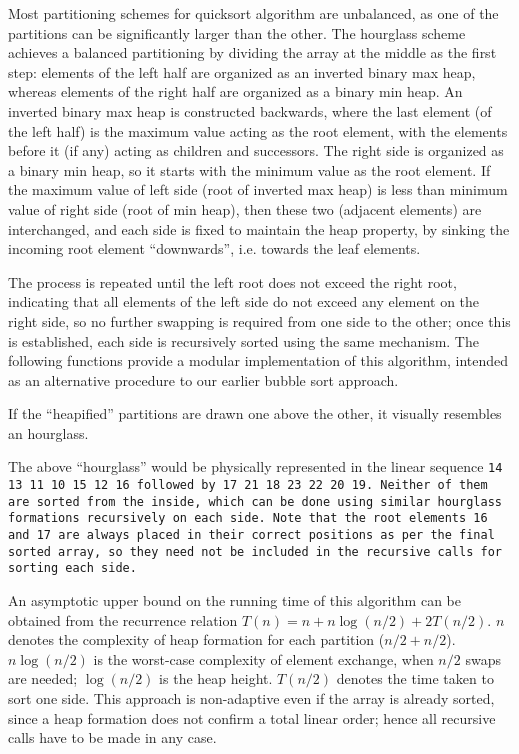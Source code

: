 Most partitioning schemes for quicksort algorithm are unbalanced,
as one of the partitions can be significantly larger than the other.
The hourglass scheme achieves a balanced partitioning by dividing
the array at the middle as the first step: elements of the left
half are organized as an inverted binary max heap, whereas
elements of the right half are organized as a binary min heap.
An inverted binary max heap is constructed backwards, where the last
element (of the left half) is the maximum value acting as the root element,
with the elements before it (if any) acting as children and successors.
The right side is organized as a binary min heap,
so it starts with the minimum value as the root element.
If the maximum value of left side (root of inverted max heap) is less than
minimum value of right side (root of min heap), then these two (adjacent elements)
are interchanged, and each side is fixed to maintain the heap property, by
sinking the incoming root element ``downwards'', i.e. towards the leaf elements.

The process is repeated until the left root does not exceed the right root,
indicating that all elements of the left side do not exceed any element on
the right side, so no further swapping is required from one side to the other;
once this is established, each side is recursively sorted using the same mechanism.
The following functions provide a modular implementation of this algorithm,
intended as an alternative procedure to our earlier bubble sort approach.\\


\example If the ``heapified'' partitions are drawn one
above the other, it visually resembles an hourglass.


The above ``hourglass'' would be physically represented in the linear sequence
\tt{14 13 11 10 15 12 16} followed by \tt{17 21 18 23 22 20 19}.
Neither of them are sorted from the inside, which can be done
using similar hourglass formations recursively on each side.
Note that the root elements \tt{16} and \tt{17} are always placed
in their correct positions as per the final sorted array, so they
need not be included in the recursive calls for sorting each side.

\enlargethispage*{\baselineskip}
\enlargethispage*{\baselineskip}

\note An asymptotic upper bound on the running time of this algorithm can be
obtained from the recurrence relation $T(n) = n + n \log(n / 2) + 2T(n/2)$.
$n$ denotes the complexity of heap formation for each partition ($n/2 + n/2$).
$n \log(n / 2)$ is the worst-case complexity of element exchange,
when $n/2$ swaps are needed; $\log(n / 2)$ is the heap height.
$T(n/2)$ denotes the time taken to sort one side.
This approach is non-adaptive even if the array is already sorted,
since a heap formation does not confirm a total linear order;
hence all recursive calls have to be made in any case.

\pagebreak
